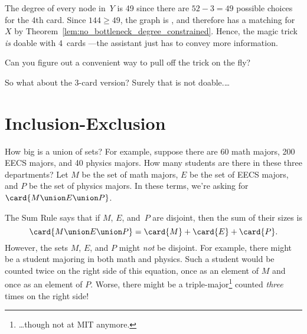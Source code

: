 \begin{editingnotes}
The degree of every node in~$Y$ is 49 since there are $52 - 3 = 49$
possible choices for the 4th card.  Since $144 \ge 49$, the graph is
, and therefore has a matching for~$X$ by
Theorem~\ref{lem:no_bottleneck_degree_constrained}.
Hence, the magic trick \emph{is} doable with 4~cards ---the assistant
just has to convey more information.  


Can you figure out a convenient
way to pull off the trick on the fly?

So what about the 3-card version?  Surely that is not doable.\dots
\end{editingnotes}

\begin{problems}

\practiceproblems
{}

\classproblems
{}

\homeworkproblems
{}

\examproblems
{}

\end{problems}



\section{Inclusion-Exclusion}\label{inc-ex_sec}

How big is a union of sets?  For example, suppose there are 60 math
majors, 200 EECS majors, and 40 physics majors.  How many students are
there in these three departments?  Let $M$ be the set of math majors,
$E$ be the set of EECS majors, and $P$ be the set of physics majors.  In
these terms, we're asking for $\card{M \union E \union P}$.

The Sum Rule says that if $M$, $E$, and~$P$ are disjoint, then the sum
of their sizes is
%
\[
\card{M \union E \union P} = \card{M} + \card{E} + \card{P} .
\]
%
However, the sets $M$, $E$, and $P$ might \emph{not} be disjoint.  For
example, there might be a student majoring in both math and
physics.  Such a student would be counted twice on the right side of this
equation, once as an element of $M$ and once as an element of $P$.  Worse,
there might be a triple-major\footnote{\dots though not at MIT anymore.}
counted \emph{three} times on the right side!

